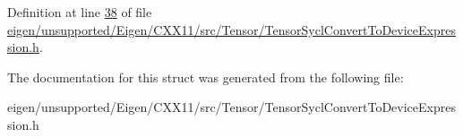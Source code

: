Definition at line \hyperlink{eigen_2unsupported_2_eigen_2_c_x_x11_2src_2_tensor_2_tensor_sycl_convert_to_device_expression_8h_source_l00038}{38} of file \hyperlink{eigen_2unsupported_2_eigen_2_c_x_x11_2src_2_tensor_2_tensor_sycl_convert_to_device_expression_8h_source}{eigen/unsupported/\+Eigen/\+C\+X\+X11/src/\+Tensor/\+Tensor\+Sycl\+Convert\+To\+Device\+Expression.\+h}.



The documentation for this struct was generated from the following file\+:\begin{DoxyCompactItemize}
\item 
eigen/unsupported/\+Eigen/\+C\+X\+X11/src/\+Tensor/\+Tensor\+Sycl\+Convert\+To\+Device\+Expression.\+h\end{DoxyCompactItemize}
